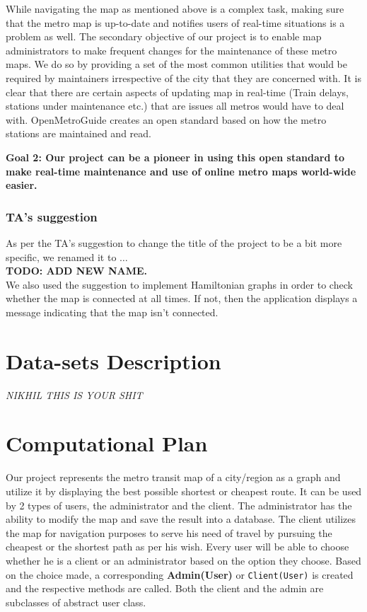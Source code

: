 \documentclass[fontsize=11pt]{article}
\begin{document}
    While navigating the map as mentioned above is a complex task, making sure that the metro map is up-to-date and notifies users of real-time situations is a problem as well. The secondary objective of our project is to enable map administrators to make frequent changes for the maintenance of these metro maps. We do so by providing a set of the most common utilities that would be required by maintainers irrespective of the city that they are concerned with. It is clear that there are certain aspects of updating map in real-time (Train delays, stations under maintenance etc.) that are issues all metros would have to deal with. OpenMetroGuide creates an open standard based on how the metro stations are maintained and read.\newline


    \textbf{Goal 2:
    Our project can be a pioneer in using this open standard to make real-time maintenance and use of online metro maps world-wide easier.
    }\newline

    \subsubsection{TA's suggestion}
    As per the TA's suggestion to change the title of the project to be a bit more specific, we renamed it to $\dots$\\
    \textbf{TODO: ADD NEW NAME.}\\
    We also used the suggestion to implement Hamiltonian graphs in order to check whether the map is connected at all times. If not, then the application displays a message indicating that the map isn't connected.
    \section*{Data-sets Description}
    \textit{NIKHIL THIS IS YOUR SHIT}

    \section*{Computational Plan}
    Our project represents the metro transit map of a city/region as a graph and utilize it by displaying the best possible shortest or cheapest route. It can be used by 2 types of users, the administrator and the client. The administrator has the ability to modify the map and save the result into a database. The client utilizes the map for navigation purposes to serve his need of travel by pursuing the cheapest or the shortest path as per his wish. Every user will be able to choose whether he is a client or an administrator based on the option they choose. Based on the choice made, a corresponding \textbf{Admin(User)} or \texttt{Client(User)} is created and the respective methods are called. Both the client and the admin are subclasses of abstract user class.
\end{document}
